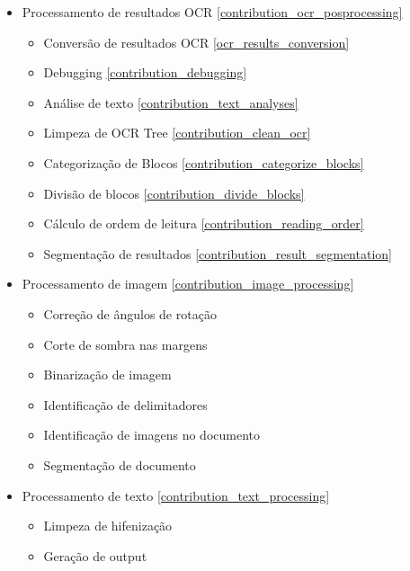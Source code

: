 \begin{itemize}\setlength\itemsep{-0.3em}
	
	\item Processamento de resultados OCR \ref{contribution_ocr_posprocessing}
	
	\begin{itemize}\setlength\itemsep{-0.3em}
		\vspace{-0.5em}
		\item Conversão de resultados OCR \ref{ocr_results_conversion}
		\item Debugging \ref{contribution_debugging}
		\item Análise de texto \ref{contribution_text_analyses}
		\item Limpeza de OCR Tree \ref{contribution_clean_ocr}
		\item Categorização de Blocos \ref{contribution_categorize_blocks}
		\item Divisão de blocos \ref{contribution_divide_blocks}
		\item Cálculo de ordem de leitura \ref{contribution_reading_order}
		\item Segmentação de resultados \ref{contribution_result_segmentation}
	\end{itemize}
	
	\item Processamento de imagem \ref{contribution_image_processing}
	\begin{itemize}\setlength\itemsep{-0.3em}
		\vspace{-0.5em}
		\item Correção de ângulos de rotação
		\item Corte de sombra nas margens
		\item Binarização de imagem
		\item Identificação de delimitadores
		\item Identificação de imagens no documento
		\item Segmentação de documento
	\end{itemize}
	
	\item Processamento de texto \ref{contribution_text_processing}
	\begin{itemize}\setlength\itemsep{-0.3em}
		\vspace{-0.5em}
		\item Limpeza de hifenização
		\item Geração de output
	\end{itemize}
		
		
\end{itemize}



